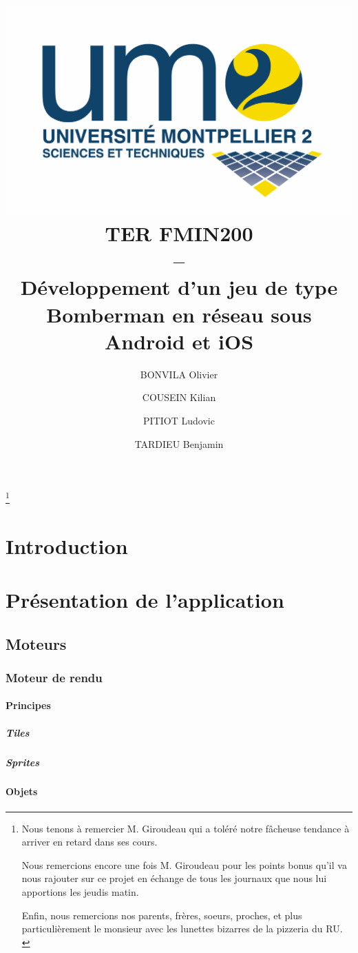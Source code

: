\documentclass[a4paper,11pt]{report}
\title{
	\includegraphics[scale=.2]{logofds.eps}\\
	\vspace*{1cm}
	TER FMIN200 \\ 
	-- \\
	Développement d'un jeu de type Bomberman en réseau sous Android et iOS
}
\author{BONVILA Olivier \and COUSEIN Kilian \and PITIOT Ludovic \and TARDIEU Benjamin}
\date{}
\begin{document}
\maketitle

\thanks{

  Nous tenons à remercier M. Giroudeau qui a toléré notre fâcheuse
  tendance à arriver en retard dans ses cours.
  
  Nous remercions encore une fois M. Giroudeau pour les points bonus
  qu'il va nous rajouter sur ce projet en échange de tous les journaux
  que nous lui apportions les jeudis matin.
  
  Enfin, nous remercions nos parents, frères, soeurs, proches, et plus
  particulièrement le monsieur avec les lunettes bizarres de la
  pizzeria du RU.\\ 

}


\tableofcontents

\chapter{Introduction}


\chapter{Présentation de l'application}

	\section{Moteurs}
		
		\subsection{Moteur de rendu}
		
			\subsubsection{Principes}
		
				\paragraph{Tiles}
			
				\paragraph{Sprites}
		
			\subsubsection{Objets}
			
\end{document}
